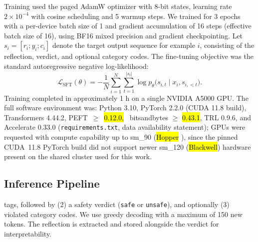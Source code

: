 \documentclass[superintelligence,article,accept,moreauthors]{Definitions/mdpi}
\begin{document}
Training used the paged AdamW optimizer with 8-bit states, learning rate $2 \times 10^{-4}$ with cosine scheduling and 5 warmup steps. We trained for 3 epochs with a per-device batch size of 1 and gradient accumulation of 16 steps (effective batch size of 16), using BF16 mixed precision and gradient checkpointing. Let $s_i = [r_i; y_i; c_i]$ denote the target output sequence for example $i$, consisting of the reflection, verdict, and optional category codes. The fine-tuning objective was the standard autoregressive negative log-likelihood:
\begin{equation}
  \mathcal{L}_{\text{SFT}}(\theta) = - \frac{1}{N} \sum_{i=1}^{N} \sum_{t=1}^{|s_i|}
  \log p_{\theta}\bigl(s_{i,t} \mid x_i, s_{i,<t}\bigr).
\end{equation}
Training completed in approximately 1 h on a single NVIDIA A5000 GPU. The full software environment was: Python 3.10, PyTorch 2.2.0 (CUDA 11.8 build), Transformers 4.44.2, \mbox{PEFT $\geq$\hl{ 0.12.0,} %
} bitsandbytes $\geq$ \hl{0.43.1}, TRL 0.9.6, and Accelerate 0.33.0 (\texttt{requirements.txt}, data availability statement); GPUs were requested with compute capability up to sm\_90 (\hl{Hopper}%
), since the pinned CUDA~11.8 PyTorch build did not support newer sm\_120 (\hl{Blackwell}) hardware present on the shared cluster used for this work.

\subsection{Inference Pipeline}

 tags, followed by (2) a safety verdict (\texttt{safe} or \texttt{unsafe}), and optionally (3) violated category codes. We use greedy decoding with a maximum of 150 new tokens. The reflection is extracted and stored alongside the verdict for interpretability.
\end{document}
